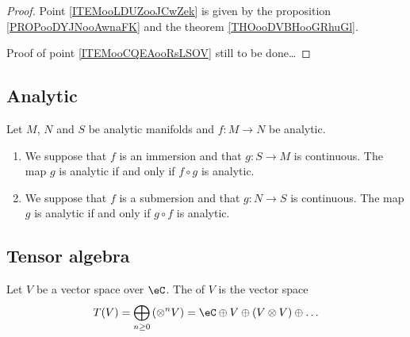 \begin{proof}
    Point \ref{ITEMooLDUZooJCwZek} is given by the proposition \ref{PROPooDYJNooAwnaFK} and the theorem \ref{THOooDVBHooGRhuGl}.

    Proof of point \ref{ITEMooCQEAooRsLSOV} still to be done\ldots
\end{proof}

\subsection{Analytic}

\begin{proposition}       \label{PROPooKAXOooZCwcwi}
    Let \( M\), \( N\) and \( S\) be analytic manifolds and \( f\colon M\to N\) be analytic.
    \begin{enumerate}
        \item
            We suppose that \( f\) is an immersion and that \( g\colon S\to M\) is continuous. The map \( g\) is analytic if and only if \( f\circ g\) is analytic.
        \item
            We suppose that \( f\) is a submersion and that \( g\colon N\to S\) is continuous. The map \( g\) is analytic if and only if \( g\circ f\) is analytic.
    \end{enumerate}
\end{proposition}


\subsection{Tensor algebra}

\begin{definition}      \label{DEFooHPQXooETvEyn}
    Let \( V\) be a vector space over \( \eC\). The  of \( V\) is the vector space
    \begin{equation}
        T(V)=\bigoplus_{n\geq 0}\left(\otimes^nV\right)=\eC\oplus V\oplus(V\otimes V)\oplus\ldots
    \end{equation}
\end{definition}



